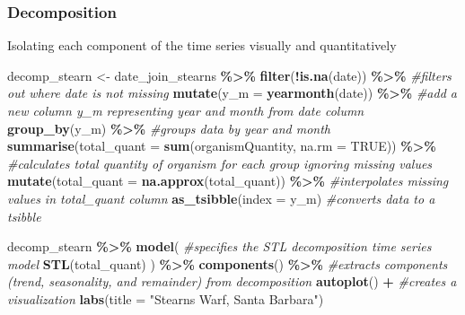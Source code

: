 \documentclass[
]{article}
\newenvironment{Shaded}{\begin{snugshade}}{\end{snugshade}}
\newcommand{\AttributeTok}[1]{\textcolor[rgb]{0.13,0.29,0.53}{#1}}
\newcommand{\CommentTok}[1]{\textcolor[rgb]{0.56,0.35,0.01}{\textit{#1}}}
\newcommand{\ConstantTok}[1]{\textcolor[rgb]{0.56,0.35,0.01}{#1}}
\newcommand{\FunctionTok}[1]{\textcolor[rgb]{0.13,0.29,0.53}{\textbf{#1}}}
\newcommand{\NormalTok}[1]{#1}
\newcommand{\OtherTok}[1]{\textcolor[rgb]{0.56,0.35,0.01}{#1}}
\newcommand{\SpecialCharTok}[1]{\textcolor[rgb]{0.81,0.36,0.00}{\textbf{#1}}}
\newcommand{\StringTok}[1]{\textcolor[rgb]{0.31,0.60,0.02}{#1}}
\begin{document}
\hypertarget{decomposition}{%
\subsubsection{Decomposition}\label{decomposition}}

Isolating each component of the time series visually and quantitatively

\begin{Shaded}
\begin{Highlighting}[]
\NormalTok{decomp\_stearn }\OtherTok{\textless{}{-}}\NormalTok{ date\_join\_stearns }\SpecialCharTok{\%\textgreater{}\%}
  \FunctionTok{filter}\NormalTok{(}\SpecialCharTok{!}\FunctionTok{is.na}\NormalTok{(date)) }\SpecialCharTok{\%\textgreater{}\%}  \CommentTok{\#filters out where date is not missing}
  \FunctionTok{mutate}\NormalTok{(}\AttributeTok{y\_m =} \FunctionTok{yearmonth}\NormalTok{(date)) }\SpecialCharTok{\%\textgreater{}\%} \CommentTok{\#add a new column y\_m representing year and month from date column}
  \FunctionTok{group\_by}\NormalTok{(y\_m) }\SpecialCharTok{\%\textgreater{}\%} \CommentTok{\#groups data by year and month}
  \FunctionTok{summarise}\NormalTok{(}\AttributeTok{total\_quant =} \FunctionTok{sum}\NormalTok{(organismQuantity, }\AttributeTok{na.rm =} \ConstantTok{TRUE}\NormalTok{)) }\SpecialCharTok{\%\textgreater{}\%} \CommentTok{\#calculates total quantity of organism for each group ignoring missing values}
  \FunctionTok{mutate}\NormalTok{(}\AttributeTok{total\_quant =} \FunctionTok{na.approx}\NormalTok{(total\_quant)) }\SpecialCharTok{\%\textgreater{}\%} \CommentTok{\#interpolates missing values in total\_quant column}
  \FunctionTok{as\_tsibble}\NormalTok{(}\AttributeTok{index =}\NormalTok{ y\_m) }\CommentTok{\#converts data to a tsibble}
\end{Highlighting}
\end{Shaded}

\begin{Shaded}
\begin{Highlighting}[]
\NormalTok{decomp\_stearn }\SpecialCharTok{\%\textgreater{}\%} \FunctionTok{model}\NormalTok{( }\CommentTok{\#specifies the STL decomposition time series model }
    \FunctionTok{STL}\NormalTok{(total\_quant)}
\NormalTok{  ) }\SpecialCharTok{\%\textgreater{}\%}
  \FunctionTok{components}\NormalTok{() }\SpecialCharTok{\%\textgreater{}\%} \CommentTok{\#extracts components (trend, seasonality, and remainder) from decomposition}
  \FunctionTok{autoplot}\NormalTok{() }\SpecialCharTok{+} \CommentTok{\#creates a visualization}
  \FunctionTok{labs}\NormalTok{(}\AttributeTok{title =} \StringTok{"Stearns Warf, Santa Barbara"}\NormalTok{)}
\end{Highlighting}
\end{Shaded}
\end{document}
